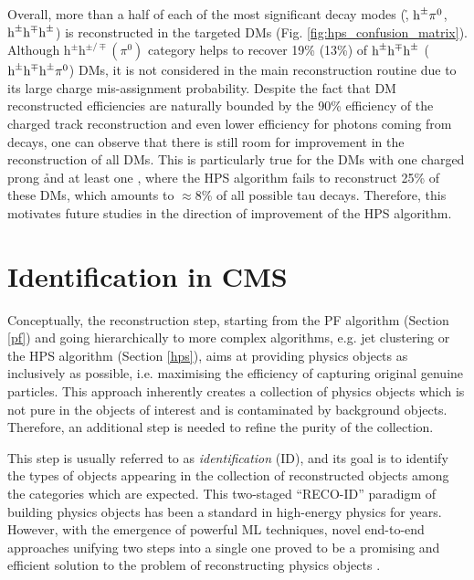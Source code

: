 Overall, more than a half of each of the most significant \tauh decay modes (\h, $\text{h}^\pm \pi^0$, $\text{h}^\pm \text{h}^\mp \text{h}^\pm$) is reconstructed in the targeted DMs (Fig. \ref{fig:hps_confusion_matrix}). Although $\text{h}^\pm\text{h}^{\pm/\mp} (\pi^0)$ category helps to recover 19\% (13\%) of $\text{h}^\pm \text{h}^\mp \text{h}^\pm$ ($\text{h}^\pm \text{h}^\mp \text{h}^\pm \pi^0$) DMs, it is not considered in the main \tauh reconstruction routine due to its large charge mis-assignment probability. Despite the fact that DM reconstructed efficiencies are naturally bounded by the 90\% efficiency of the charged track reconstruction and even lower efficiency for photons coming from \piz decays, one can observe that there is still room for improvement in the reconstruction of all DMs. This is particularly true for the DMs with one charged prong \h and at least one \piz, where the HPS algorithm fails to reconstruct 25\% of these DMs, which amounts to $\approx$8\% of all possible tau decays. Therefore, this motivates future studies in the direction of improvement of the HPS algorithm.

\section{Identification in CMS}
Conceptually, the reconstruction step, starting from the PF algorithm (Section \ref{pf}) and going hierarchically to more complex algorithms, e.g. jet clustering or the HPS algorithm (Section \ref{hps}), aims at providing physics objects as inclusively as possible, i.e. maximising the efficiency of capturing original genuine particles. This approach inherently creates a collection of physics objects which is not pure in the objects of interest and is contaminated by background objects. Therefore, an additional step is needed to refine the purity of the collection. 

This step is usually referred to as \textit{identification} (ID), and its goal is to identify the types of objects appearing in the collection of reconstructed objects among the categories which are expected. This two-staged \enquote{RECO-ID} paradigm of building physics objects has been a standard in high-energy physics for years. However, with the emergence of powerful ML techniques, novel end-to-end approaches unifying two steps into a single one proved to be a promising and efficient solution to the problem of reconstructing physics objects \cite{CMS:2022wjj,Pata:2021oez}. 

